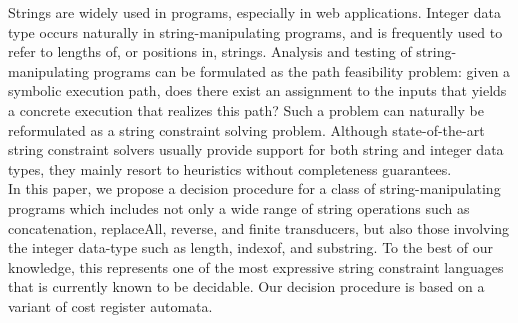 
Strings are widely used in programs, especially in web applications.
Integer data type occurs naturally in string-manipulating programs, and is
frequently used to refer to lengths of, or positions in, strings. 
Analysis and testing of string-manipulating programs can be formulated as the 
path feasibility problem:
given a symbolic execution path, does there exist an assignment to the inputs 
that yields a concrete execution that realizes this path?
Such a problem can naturally be reformulated as a string constraint solving
problem.
Although state-of-the-art string constraint solvers usually provide support for both string and integer data types,   
they mainly resort to heuristics without completeness guarantees. \\ %
%
In this paper, we propose a decision procedure 
for a class of string-manipulating programs
which includes  not only a wide range of string operations such as concatenation, replaceAll, reverse, and finite transducers, but also those involving the integer data-type such as length, indexof, and substring. To the best of our knowledge, this represents one of the most expressive string constraint languages that is currently known to be decidable.  Our decision procedure is based on a variant of cost register automata. %
